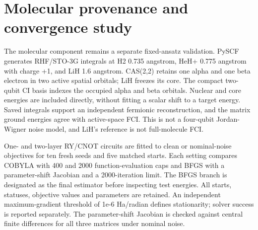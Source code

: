 \documentclass[11pt]{article}
\begin{document}
\section{Molecular provenance and convergence study}
The molecular component remains a separate fixed-ansatz validation. PySCF \cite{pyscf} generates RHF/STO-3G integrals at H2 0.735 angstrom, HeH+ 0.775 angstrom with charge +1, and LiH 1.6 angstrom. CAS(2,2) retains one alpha and one beta electron in two active spatial orbitals; LiH freezes its core. The compact two-qubit CI basis indexes the occupied alpha and beta orbitals. Nuclear and core energies are included directly, without fitting a scalar shift to a target energy. Saved integrals support an independent fermionic reconstruction, and the matrix ground energies agree with active-space FCI. This is not a four-qubit Jordan-Wigner noise model, and LiH's reference is not full-molecule FCI.

One- and two-layer RY/CNOT circuits are fitted to clean or nominal-noise objectives for ten fresh seeds and five matched starts. Each setting compares COBYLA with 400 and 2000 function-evaluation caps and BFGS with a parameter-shift Jacobian and a 2000-iteration limit. The BFGS branch is designated as the final estimator before inspecting test energies. All starts, statuses, objective values and parameters are retained. An independent maximum-gradient threshold of 1e-6 Ha/radian defines stationarity; solver success is reported separately. The parameter-shift Jacobian is checked against central finite differences for all three matrices under nominal noise.
\end{document}
